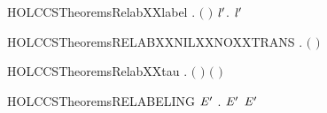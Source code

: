\newcommand{\HOLCCSTheoremsRELABXXcasesXXEQ}{\UseVerbatim{HOLCCSTheoremsRELABXXcasesXXEQ}}
\begin{SaveVerbatim}{HOLCCSTheoremsRelabXXlabel}
\HOLTokenTurnstile{} \HOLSymConst{\HOLTokenForall{}}  . \ensuremath{(}   \HOLSymConst{\ensuremath{=}}  \ensuremath{)} \HOLSymConst{\HOLTokenImp{}} \HOLSymConst{\HOLTokenExists{}}\ensuremath{\HOLBoundVar{l}\sp{\prime{}}}.  \HOLSymConst{\ensuremath{=}}  \ensuremath{\HOLBoundVar{l}\sp{\prime{}}}
\end{SaveVerbatim}
\newcommand{\HOLCCSTheoremsRelabXXlabel}{\UseVerbatim{HOLCCSTheoremsRelabXXlabel}}
\begin{SaveVerbatim}{HOLCCSTheoremsRELABXXNILXXNOXXTRANS}
\HOLTokenTurnstile{} \HOLSymConst{\HOLTokenForall{}}  . \HOLSymConst{\HOLTokenNeg{}}\ensuremath{(}   \HOLTokenTransBegin{}\HOLTokenTransEnd {}\ensuremath{)}
\end{SaveVerbatim}
\newcommand{\HOLCCSTheoremsRELABXXNILXXNOXXTRANS}{\UseVerbatim{HOLCCSTheoremsRELABXXNILXXNOXXTRANS}}
\begin{SaveVerbatim}{HOLCCSTheoremsRelabXXtau}
\HOLTokenTurnstile{} \HOLSymConst{\HOLTokenForall{}} . \ensuremath{(}   \HOLSymConst{\ensuremath{=}} \HOLConst{\ensuremath{\tau}}\ensuremath{)} \HOLSymConst{\HOLTokenImp{}} \ensuremath{(} \HOLSymConst{\ensuremath{=}} \HOLConst{\ensuremath{\tau}}\ensuremath{)}
\end{SaveVerbatim}
\newcommand{\HOLCCSTheoremsRelabXXtau}{\UseVerbatim{HOLCCSTheoremsRelabXXtau}}
\begin{SaveVerbatim}{HOLCCSTheoremsRELABELING}
\HOLTokenTurnstile{} \HOLSymConst{\HOLTokenForall{}}  \ensuremath{\HOLBoundVar{E}\sp{\prime{}}} .  \HOLTokenTransBegin{}\HOLTokenTransEnd \ensuremath{\HOLBoundVar{E}\sp{\prime{}}} \HOLSymConst{\HOLTokenImp{}}    \HOLTokenTransBegin{}  \HOLTokenTransEnd {} \ensuremath{\HOLBoundVar{E}\sp{\prime{}}} 
\end{SaveVerbatim}
\newcommand{\HOLCCSTheoremsRELABELING}{\UseVerbatim{HOLCCSTheoremsRELABELING}}

